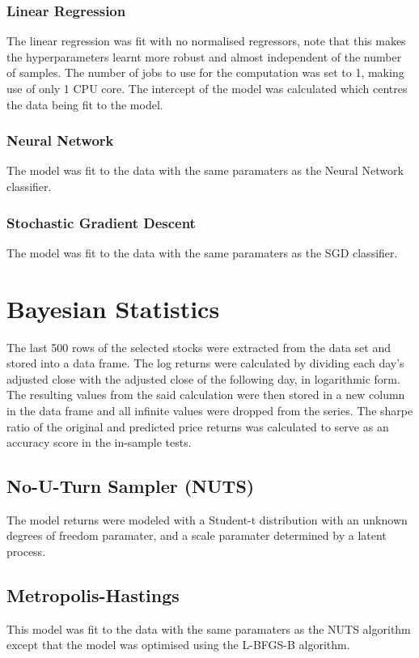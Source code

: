 \subsubsection{Linear Regression}
The linear regression was fit with no normalised regressors, note that this makes the hyperparameters learnt more robust and almost independent of the number of samples. The number of jobs to use for the computation was set to 1, making use of only 1 CPU core. The intercept of the model was calculated which centres the data being fit to the model.

\subsubsection{Neural Network}
The model was fit to the data with the same paramaters as the Neural Network classifier.

\subsubsection{Stochastic Gradient Descent}
The model was fit to the data with the same paramaters as the SGD classifier.

\section{Bayesian Statistics}
The last 500 rows of the selected stocks were extracted from the data set and stored into a data frame. The log returns were calculated by dividing each day's adjusted close with the adjusted close of the following day, in logarithmic form. The resulting values from the said calculation were then stored in a new column in the data frame and all infinite values were dropped from the series. The sharpe ratio of the original and predicted price returns was calculated to serve as an accuracy score in the in-sample tests.

\subsection{No-U-Turn Sampler (NUTS)}
The model returns were modeled with a Student-t distribution with an unknown degrees of freedom paramater, and a scale paramater determined by a latent process. 

\subsection{Metropolis-Hastings}
This model was fit to the data with the same paramaters as the NUTS algorithm except that the model was optimised using the L-BFGS-B algorithm.

